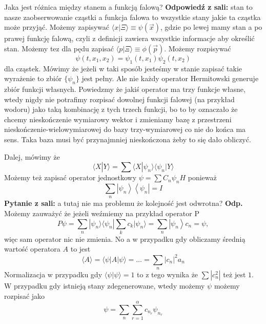 Jaka jest różnica między stanem a funkcją falową? \textbf{Odpowiedź z sali:} stan to nasze zaobserwowanie cząstki a funkcja falowa to wszystkie stany jakie ta cząstka może przyjąć. Możemy zapisywać $\langle x | \Xi \rangle \equiv \psi (\vec{x})$, gdzie po lewej mamy stan a po prawej funkcję falową, czyli z definicji zawiera wszystkie informacje aby określić stan. Możemy tez dla pędu zapisać $\langle p | \Xi \rangle \equiv \phi (\vec{p})$. Możemy rozpisywać $$ \psi(t, x_1, x_2) = \psi_1(t, x_1) \psi_2(t, x_2) $$ dla cząstek.
Mówimy że jeżeli w taki sposób jesteśmy w stanie zapisać takie wyrażenie to zbiór $\{\psi_n\}$ jest pełny. Ale nie każdy operator Hermitowski generuje zbiór funkcji własnych. Powiedzmy że jakiś operator ma trzy funkcje własne, wtedy nigdy nie potrafimy rozpisać dowolnej funkcji falowej (na przykład wodoru) jako taką kombinację z tych trzech funkcji, bo to by oznaczało że chcemy nieskończenie wymiarowy wektor i zmieniamy bazę z przestrzeni nieskończenie-wielowymiarowej do bazy trzy-wymiarowej co nie do końca ma sens. Taka baza musi być przynajmniej nieskończona żeby to się dało obliczyć.

Dalej, mówimy że 
\begin{equation*}
	\langle X | Y \rangle = \sum \langle X | \psi_n \rangle \langle \psi_n | Y \rangle
\end{equation*}
Możemy też zapisać operator jednostkowy $ \psi=\sum C_{n} \psi_{n} H $ ponieważ
\begin{equation*}
	\sum_{n}\left|\psi_{n}\right\rangle\left\langle\psi_{n}\right|=I 
\end{equation*}
\textbf{Pytanie z sali:} a tutaj nie ma problemu że kolejność jest odwrotna? \textbf{Odp.} Możemy zauważyć że jeżeli weźmiemy na przykład operator P
\begin{equation*}
	P \psi=\sum_{n} |\psi_{n} \rangle \langle \psi_{n} | \sum_{k} c_{k} |\psi_{n} \rangle  =\sum_{n}\left|\psi_{n}\right\rangle c_{n}=\psi,
\end{equation*}
więc sam operator nic nie zmienia.
No a w przypadku gdy obliczamy średnią wartość operatora $A$ to jest 
\begin{equation*}
	\langle A\rangle=\langle\psi| A|\psi\rangle= \dotsc = \sum_{n}\left|c_{n}\right|^{2} a_{n}
\end{equation*}
Normalizacja w przypadku gdy $\langle \psi | \psi \rangle = 1$ to z tego wynika że $\sum |c_n^2|$ też jest $1$.
W przypadku gdy istnieją stany zdegenerowane, wtedy możemy $\psi$ możemy rozpisać jako 
\begin{equation*}
	\psi = \sum_n \sum_{r=1}^{\alpha} c_{n_r} \psi_{n_r}
\end{equation*}

